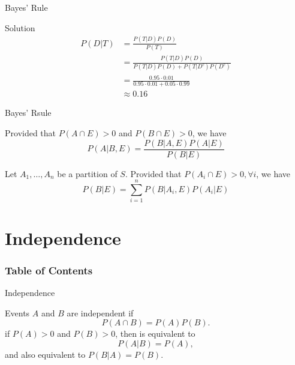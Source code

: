 \documentclass{beamer}
\begin{document}
\begin{frame}{Bayes' Rule}
    \begin{block}{Solution}
        \[
            \begin{aligned}
                P(D|T)&=\frac{P(T|D)P(D)}{P(T)} \\
                &=\frac{P(T|D)P(D)}{P(T|D)P(D) + P(T|D^c)P(D^c)} \\
                &= \frac{0.95 \cdot 0.01}{0.95 \cdot 0.01 + 0.05 \cdot 0.99} \\
                &\approx 0.16
            \end{aligned}
        \]
    \end{block}
\end{frame}


\begin{frame}{Bayes' Rsule}
    \begin{theorem}
        Provided that $P(A \cap E) > 0$ and $P(B \cap E) > 0$, we have
        \[
            P(A|B,E) = \frac{P(B|A,E)P(A|E)}{P(B|E)}
        \]
    \end{theorem}
    \begin{theorem}
        Let $A_1,\dots,A_n$ be a partition  of $S$. Provided that $P(A_i \cap E) > 0, \forall i$, we have
        \[
            P(B|E) = \sum^n_{i=1} P(B|A_i,E)P(A_i|E)
        \]
    \end{theorem}
\end{frame}


\section{Independence}

\begin{frame}
    \frametitle{Table of Contents}
    \tableofcontents[currentsection]
\end{frame}

\begin{frame}{Independence}
    \begin{definition}
        Events $A$ and $B$ are independent if
        \[
            P(A\cap B) = P(A)P(B).
        \]
        if $P(A) > 0$ and $P(B) > 0$, then is equivalent to
        \[
            P(A|B) = P(A),
        \]
        and also equivalent to $P(B|A) = P(B)$.
    \end{definition}
\end{frame}
\end{document}
